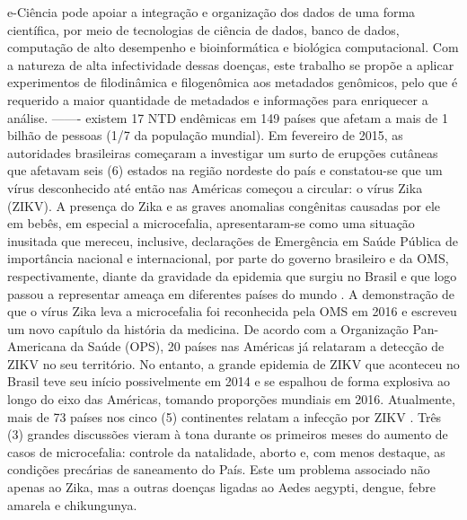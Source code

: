 e-Ciência pode apoiar a integração e organização dos dados de uma forma científica, por meio de tecnologias de ciência de dados, banco de dados, computação de alto desempenho e bioinformática e biológica computacional. Com a natureza de alta infectividade dessas doenças, este trabalho se propõe a aplicar experimentos de filodinâmica e filogenômica aos metadados genômicos, pelo que é requerido a maior quantidade de metadados e informações para enriquecer a análise. 
-------
existem 17 NTD  endêmicas em 149 países que afetam a mais de 1 bilhão de pessoas (1/7 da população mundial). 
Em fevereiro de 2015, as autoridades brasileiras começaram a investigar um surto de erupções cutâneas que afetavam seis (6) estados na região nordeste do país e constatou-se que um vírus desconhecido até então nas Américas começou a circular: o vírus Zika (ZIKV). A presença do Zika e as graves anomalias congênitas causadas por ele em bebês, em especial a microcefalia, apresentaram-se como uma situação inusitada que mereceu, inclusive, declarações de Emergência em Saúde Pública de importância nacional e internacional, por parte do governo brasileiro e da OMS, respectivamente, diante da gravidade da epidemia que surgiu no Brasil e que logo passou a representar ameaça em diferentes países do mundo . A demonstração de que o vírus Zika leva a microcefalia foi reconhecida pela OMS em 2016 e escreveu um novo capítulo da história da medicina. De acordo com a Organização Pan-Americana da Saúde (OPS), 20 países nas Américas  já relataram a detecção de ZIKV no seu território. No entanto, a grande epidemia de ZIKV que aconteceu no Brasil teve seu início possivelmente em 2014 e se espalhou de forma explosiva ao longo do eixo das Américas, tomando proporções mundiais em 2016. Atualmente, mais de 73 países nos cinco (5) continentes relatam a infecção por ZIKV .
Três (3) grandes discussões vieram à tona durante os primeiros meses do aumento de casos de microcefalia: controle da natalidade, aborto e, com menos destaque, as condições precárias de saneamento do País. Este um problema associado não apenas ao Zika, mas a outras doenças ligadas ao Aedes aegypti, dengue, febre amarela e chikungunya.

